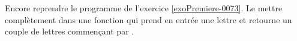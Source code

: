 
\begin{exercice}\label{exoPremiere-0073}

    Encore reprendre le programme de l'exercice \ref{exoPremiere-0073}. Le mettre complètement dans une fonction qui prend en entrée une lettre  et retourne un couple de lettres commençant par .

\end{exercice}
